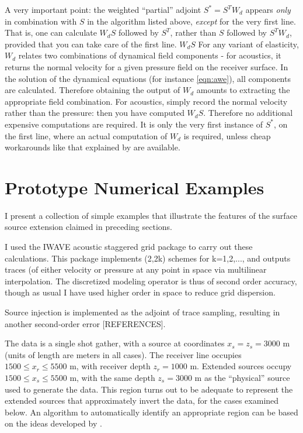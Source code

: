 A very important point: the weighted ``partial'' adjoint $S^*=S^TW_d$ appears {\em only} in combination with $S$ in the algorithm listed above, {\em except} for the very first line. That is, one can calculate $W_dS$ followed by $S^T$, rather than $S$ followed by $S^TW_d$, provided that you can take care of the first line. $W_dS$ For any variant of elasticity, $W_d$ relates two combinations of dynamical field components - for acoustics, it returns the normal velocity for a given pressure field on the receiver surface. In the solution of the dynamical equations (for instance \ref{eqn:awe}), all components are calculated. Therefore obtaining the output of $W_d$ amounts to extracting the appropriate field combination. For acoustics, simply record the normal velocity rather than the pressure: then you have computed $W_dS$. Therefore no additional expensive computations are required. It is only the very first instance of $S^*$, on the first line, where an actual computation of $W_d$ is required, unless cheap workarounds like that explained by \cite{HouSymes:15} are available.

\section{Prototype Numerical Examples}
I present a collection of simple examples that illustrate the features of the surface source extension claimed in preceding sections. 

I used the IWAVE acoustic staggered grid package to carry out these calculations. This package implements (2,2k) schemes for k=1,2,..., and outputs traces (of either velocity or pressure at any point in space via multilinear interpolation. The discretized modeling operator is thus of second order accuracy, though as usual I have used higher order in space to reduce grid dispersion.

Source injection is implemented as the adjoint of trace sampling, resulting in another second-order error [REFERENCES]. 

The data is a single shot gather, with a source at coordinates $x_s=z_s=3000$ m (units of length are meters in all cases). The receiver line occupies $1500 \le x_r \le 5500$ m, with receiver depth $z_r=1000$ m.  Extended sources occupy $1500 \le x_s \le 5500$ m, with the same depth $z_s=3000$ m as the ``physical'' source used to generate the data. This region turns out to be adequate to represent the extended sources that approximately invert the data, for the cases examined below. An algorithm to automatically identify an appropriate region can be based on the ideas developed by \cite{Fu:Geo17}.

